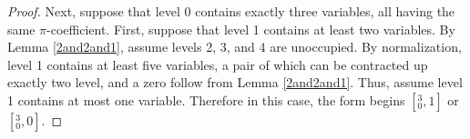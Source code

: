 \documentclass[12pt]{amsart}
\begin{document}
\begin{proof}


Next, suppose that level 0 contains exactly three variables,  all having the same $\pi$-coefficient.  First, suppose that level 1 contains at least two variables.  By Lemma \ref{2and2and1}, assume levels 2, 3, and 4 are unoccupied.  By normalization, level 1 contains at least five variables, a pair of which can be contracted up exactly two level, and a zero follow from Lemma \ref{2and2and1}.  Thus, assume level 1 contains at most one variable.  Therefore in this case, the form begins $[{}^3_0,1]$ or $[{}^3_0,0]$.





\end{proof}
\end{document}
